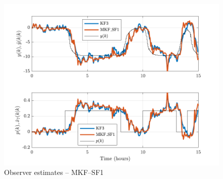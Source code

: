 
\begin{figure}[htp]
	\centering
	\includegraphics[width=13cm]{images/grind1_rod_obs_est_MKF_SF1.pdf}
	\caption{Observer estimates -- MKF--SF1}
	\label{fig:grind1_rod_obs_est_MKF_SF1}
\end{figure}

